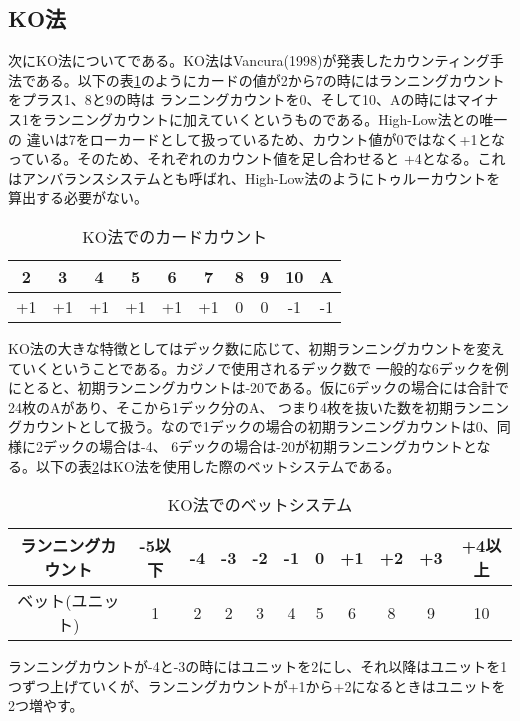 \subsection{KO法}
次にKO法についてである。KO法はVancura(1998)が発表したカウンティング手法である。以下の表\ref{koc}のようにカードの値が2から7の時にはランニングカウントをプラス1、8と9の時は
ランニングカウントを0、そして10、Aの時にはマイナス1をランニングカウントに加えていくというものである。High-Low法との唯一の
違いは7をローカードとして扱っているため、カウント値が0ではなく+1となっている。そのため、それぞれのカウント値を足し合わせると
+4となる。これはアンバランスシステムとも呼ばれ、High-Low法のようにトゥルーカウントを算出する必要がない。
  \begin{table}[H]
    \centering
    \caption{KO法でのカードカウント}
    \label{koc}
    \begin{tabular}{|c|c|c|c|c|c|c|c|c|c|} \hline
      2&3&4&5&6&7&8&9&10&A \\ \hline
      +1&+1&+1&+1&+1&+1&0&0&-1&-1 \\ \hline
    \end{tabular}
  \end{table}
  
KO法の大きな特徴としてはデック数に応じて、初期ランニングカウントを変えていくということである。カジノで使用されるデック数で
一般的な6デックを例にとると、初期ランニングカウントは-20である。仮に6デックの場合には合計で24枚のAがあり、そこから1デック分のA、
つまり4枚を抜いた数を初期ランニングカウントとして扱う。なので1デックの場合の初期ランニングカウントは0、同様に2デックの場合は-4、
6デックの場合は-20が初期ランニングカウントとなる。以下の表\ref{kob}はKO法を使用した際のベットシステムである。

  \begin{table}[H]
    \centering
    \caption{KO法でのベットシステム}
     \label{kob}
    \begin{tabular}{|c|c|c|c|c|c|c|c|c|c|c|} \hline
      ランニングカウント&-5以下&-4&-3&-2&-1&0&+1&+2&+3&+4以上 \\ \hline
      ベット(ユニット)&1&2&2&3&4&5&6&8&9&10 \\ \hline
    \end{tabular}
  \end{table}
ランニングカウントが-4と-3の時にはユニットを2にし、それ以降はユニットを1つずつ上げていくが、ランニングカウントが+1から+2になるときはユニットを2つ増やす。
